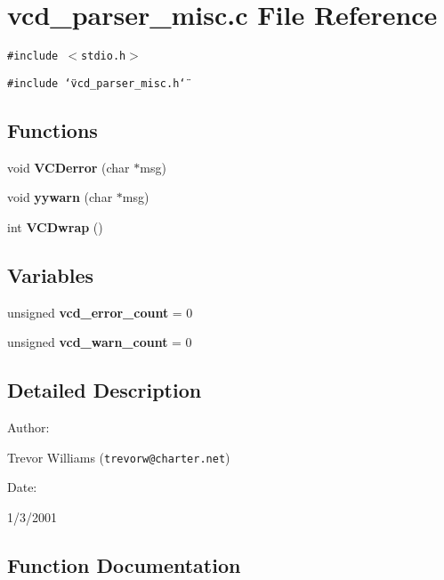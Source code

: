 \section{vcd\_\-parser\_\-misc.c File Reference}
\label{vcd__parser__misc_8c}
{\tt \#include $<$stdio.h$>$}\par
{\tt \#include \char`\"{}vcd\_\-parser\_\-misc.h\char`\"{}}\par
\subsection*{Functions}
\begin{CompactItemize}
\item 
void {\bf VCDerror} (char $\ast$msg)
\item 
void {\bf yywarn} (char $\ast$msg)
\item 
int {\bf VCDwrap} ()
\end{CompactItemize}
\subsection*{Variables}
\begin{CompactItemize}
\item 
unsigned {\bf vcd\_\-error\_\-count} = 0
\item 
unsigned {\bf vcd\_\-warn\_\-count} = 0
\end{CompactItemize}


\subsection{Detailed Description}


\begin{Desc}
\item[Author: ]\par
Trevor Williams ({\tt trevorw@charter.net}) \end{Desc}
\begin{Desc}
\item[Date: ]\par
1/3/2001\end{Desc}


\subsection{Function Documentation}
